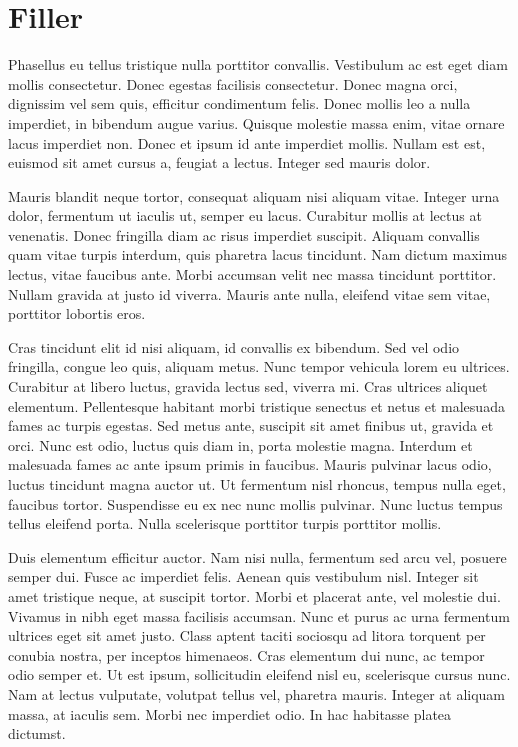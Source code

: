 \section{Filler}
Phasellus eu tellus tristique nulla porttitor convallis. Vestibulum ac est eget diam mollis consectetur. Donec egestas facilisis consectetur. Donec magna orci, dignissim vel sem quis, efficitur condimentum felis. Donec mollis leo a nulla imperdiet, in bibendum augue varius. Quisque molestie massa enim, vitae ornare lacus imperdiet non. Donec et ipsum id ante imperdiet mollis. Nullam est est, euismod sit amet cursus a, feugiat a lectus. Integer sed mauris dolor.

Mauris blandit neque tortor, consequat aliquam nisi aliquam vitae. Integer urna dolor, fermentum ut iaculis ut, semper eu lacus. Curabitur mollis at lectus at venenatis. Donec fringilla diam ac risus imperdiet suscipit. Aliquam convallis quam vitae turpis interdum, quis pharetra lacus tincidunt. Nam dictum maximus lectus, vitae faucibus ante. Morbi accumsan velit nec massa tincidunt porttitor. Nullam gravida at justo id viverra. Mauris ante nulla, eleifend vitae sem vitae, porttitor lobortis eros.

Cras tincidunt elit id nisi aliquam, id convallis ex bibendum. Sed vel odio fringilla, congue leo quis, aliquam metus. Nunc tempor vehicula lorem eu ultrices. Curabitur at libero luctus, gravida lectus sed, viverra mi. Cras ultrices aliquet elementum. Pellentesque habitant morbi tristique senectus et netus et malesuada fames ac turpis egestas. Sed metus ante, suscipit sit amet finibus ut, gravida et orci. Nunc est odio, luctus quis diam in, porta molestie magna. Interdum et malesuada fames ac ante ipsum primis in faucibus. Mauris pulvinar lacus odio, luctus tincidunt magna auctor ut. Ut fermentum nisl rhoncus, tempus nulla eget, faucibus tortor. Suspendisse eu ex nec nunc mollis pulvinar. Nunc luctus tempus tellus eleifend porta. Nulla scelerisque porttitor turpis porttitor mollis.

Duis elementum efficitur auctor. Nam nisi nulla, fermentum sed arcu vel, posuere semper dui. Fusce ac imperdiet felis. Aenean quis vestibulum nisl. Integer sit amet tristique neque, at suscipit tortor. Morbi et placerat ante, vel molestie dui. Vivamus in nibh eget massa facilisis accumsan. Nunc et purus ac urna fermentum ultrices eget sit amet justo. Class aptent taciti sociosqu ad litora torquent per conubia nostra, per inceptos himenaeos. Cras elementum dui nunc, ac tempor odio semper et. Ut est ipsum, sollicitudin eleifend nisl eu, scelerisque cursus nunc. Nam at lectus vulputate, volutpat tellus vel, pharetra mauris. Integer at aliquam massa, at iaculis sem. Morbi nec imperdiet odio. In hac habitasse platea dictumst.

